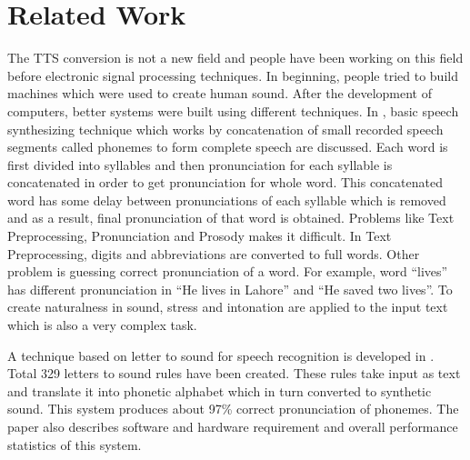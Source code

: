 \chapter{Related Work}

The TTS conversion is not a new field and people have been working on this field before electronic
signal processing techniques. In beginning, people tried to build machines which were used to
create human sound. After the development of computers, better systems were built using different
techniques. In \cite{swetha2013text}, basic speech synthesizing technique
which works by concatenation of small recorded speech segments called phonemes to form
complete speech are discussed. Each word is first divided into syllables and then pronunciation for each syllable
is concatenated in order to get pronunciation for whole word. This concatenated word has some
delay between pronunciations of each syllable which is removed and as a result, final
pronunciation of that word is obtained. Problems like Text Preprocessing, Pronunciation and
Prosody makes it difficult. In Text Preprocessing, digits and abbreviations are converted to full
words. Other problem is guessing correct pronunciation of a word. For example, word “lives” has
different pronunciation in “He lives in Lahore” and “He saved two lives”. To create naturalness in
sound, stress and intonation are applied to the input text which is also a very complex task.


A technique based on letter to sound for speech recognition is developed in \cite{elovitz1976automatic}. Total 329 letters to sound rules have
been created. These rules take input as text and translate it into phonetic alphabet which in turn converted to synthetic sound.
This system produces about 97\% correct pronunciation of phonemes. The paper also describes software and hardware
requirement and overall performance statistics of this system.

